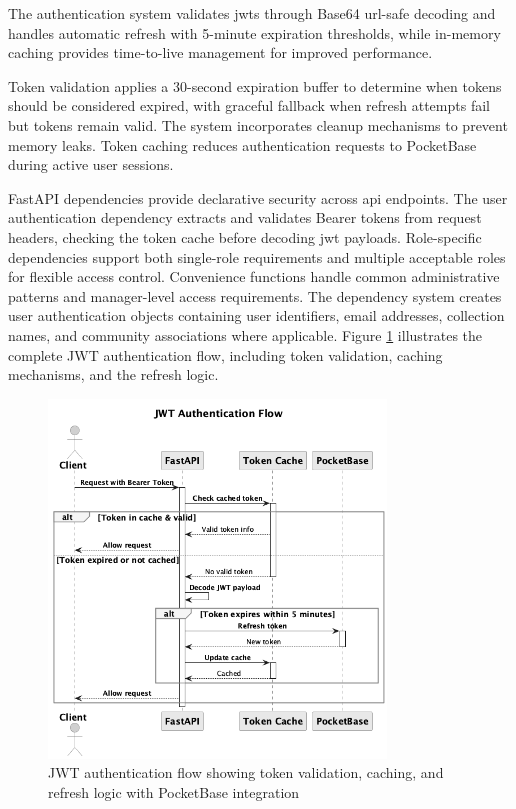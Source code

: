 The authentication system validates \acp{jwt} through Base64 \acs{url}-safe decoding and handles automatic refresh with 5-minute expiration thresholds, while in-memory caching provides time-to-live management for improved performance.

Token validation applies a 30-second expiration buffer to determine when tokens should be considered expired, with graceful fallback when refresh attempts fail but tokens remain valid. The system incorporates cleanup mechanisms to prevent memory leaks. Token caching reduces authentication requests to PocketBase during active user sessions.

FastAPI dependencies provide declarative security across \ac{api} endpoints. The user authentication dependency extracts and validates Bearer tokens from request headers, checking the token cache before decoding \ac{jwt} payloads. Role-specific dependencies support both single-role requirements and multiple acceptable roles for flexible access control. Convenience functions handle common administrative patterns and manager-level access requirements. The dependency system creates user authentication objects containing user identifiers, email addresses, collection names, and community associations where applicable. Figure \ref{fig:jwt_auth_sequence} illustrates the complete JWT authentication flow, including token validation, caching mechanisms, and the refresh logic.

\begin{figure}[htbp]
    \centering
    \includegraphics[width=0.8\textwidth]{figs/chapter4/jwt_auth_simple.png}
    \caption{JWT authentication flow showing token validation, caching, and refresh logic with PocketBase integration}
    \label{fig:jwt_auth_sequence}
\end{figure}

